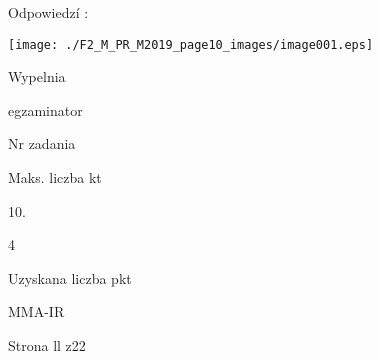 \documentclass[a4paper,12pt]{article}
\begin{document}
Odpowiedzí :
\begin{center}
\texttt{[image: ./F2\_M\_PR\_M2019\_page10\_images/image001.eps]}
\end{center}
Wypelnia

egzaminator

Nr zadania

Maks. liczba kt

10.

4

Uzyskana liczba pkt

MMA-IR

Strona ll z22
\end{document}
